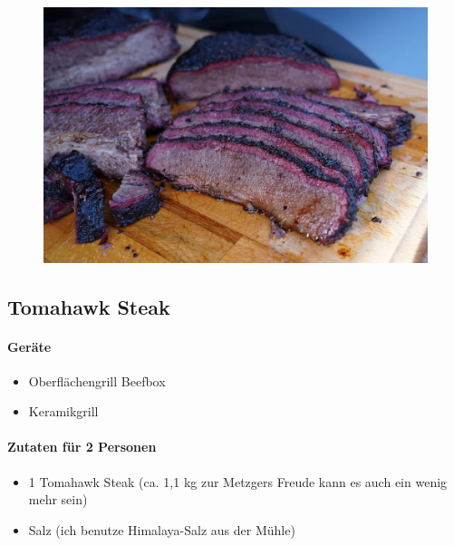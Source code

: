 \begin{figure}[htbp]
	\centering
	\begin{minipage}{1\textwidth}
		\centering
		\includegraphics[width=.9\linewidth]{pics/Brisket}
		\label{fig:Brisket}
	\end{minipage}
\end{figure}
\newpage



\subsection{Tomahawk Steak}

\paragraph{Geräte}

\begin{itemize}[noitemsep]
	\item Oberflächengrill Beefbox
	\item Keramikgrill
\end{itemize}

\paragraph{Zutaten für 2 Personen}

\begin{itemize}[noitemsep]
	\item 1 Tomahawk Steak (ca. 1,1 kg zur Metzgers Freude kann es auch ein 
	wenig mehr sein)
	\item Salz (ich benutze Himalaya-Salz aus der Mühle)
\end{itemize}

